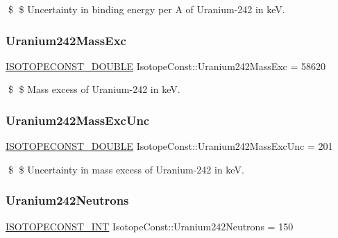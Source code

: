 \$ \$ Uncertainty in binding energy per A of Uranium-\/242 in keV. \mbox{\label{group___isotope_const-_uranium-_u242_gaa9eed680e4dca8a22c1aaeb92b0e1f2c}} 
\subsubsection{\texorpdfstring{Uranium242\+Mass\+Exc}{Uranium242MassExc}}
{\footnotesize\ttfamily \mbox{\hyperlink{group___isotope_const-_macros_ga8f45a7272ce02c0b4c65c44636ed719a}{I\+S\+O\+T\+O\+P\+E\+C\+O\+N\+S\+T\+\_\+\+D\+O\+U\+B\+LE}} Isotope\+Const\+::\+Uranium242\+Mass\+Exc = 58620}

\$ \$ Mass excess of Uranium-\/242 in keV. \mbox{\label{group___isotope_const-_uranium-_u242_ga1ac9dc1cf3557102c5692028dc21f6a7}} 
\subsubsection{\texorpdfstring{Uranium242\+Mass\+Exc\+Unc}{Uranium242MassExcUnc}}
{\footnotesize\ttfamily \mbox{\hyperlink{group___isotope_const-_macros_ga8f45a7272ce02c0b4c65c44636ed719a}{I\+S\+O\+T\+O\+P\+E\+C\+O\+N\+S\+T\+\_\+\+D\+O\+U\+B\+LE}} Isotope\+Const\+::\+Uranium242\+Mass\+Exc\+Unc = 201}

\$ \$ Uncertainty in mass excess of Uranium-\/242 in keV. \mbox{\label{group___isotope_const-_uranium-_u242_ga267fe317fdf08416052a7675d0df6bab}} 
\subsubsection{\texorpdfstring{Uranium242\+Neutrons}{Uranium242Neutrons}}
{\footnotesize\ttfamily \mbox{\hyperlink{group___isotope_const-_macros_ga5f18360b3e99483a35c32d789e62621c}{I\+S\+O\+T\+O\+P\+E\+C\+O\+N\+S\+T\+\_\+\+I\+NT}} Isotope\+Const\+::\+Uranium242\+Neutrons = 150}

